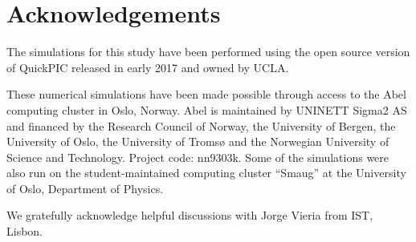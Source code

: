 \documentclass[aps,prstab,reprint,amsmath,amssymb,groupedaddress]{revtex4-1}
\begin{document}
\section{Acknowledgements}\label{Ack}

The simulations for this study have been performed using the open source version of QuickPIC released in early 2017
and owned by UCLA.

These numerical simulations have been made possible through access to the Abel computing cluster in Oslo, Norway. Abel
is maintained by UNINETT Sigma2 AS and financed by the Research Council of Norway, the University of Bergen, the
University of Oslo, the University of Troms{\o} and the Norwegian University of Science and Technology. Project code:
nn9303k. Some of the simulations were also run on the student-maintained computing cluster ``Smaug'' at the University
of Oslo, Department of Physics.

We gratefully acknowledge helpful discussions with Jorge Vieria from IST, Lisbon. 


\end{document}

